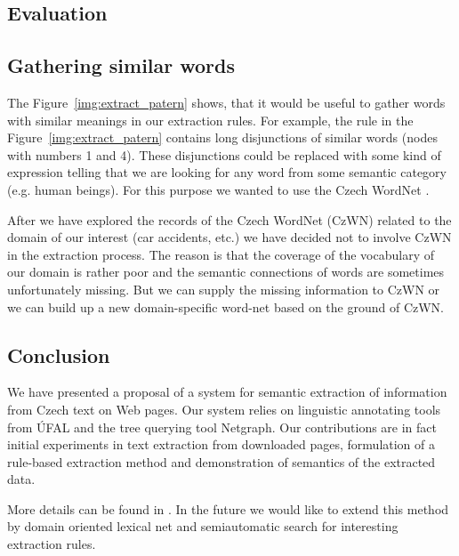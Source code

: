 \subsection{Evaluation}






\subsection{Gathering similar words}

The Figure~\ref{img:extract_patern} shows, that it would be useful to gather words with similar meanings in our extraction rules. For example, the rule in the Figure~\ref{img:extract_patern} contains long disjunctions of similar words (nodes with numbers 1 and 4). These disjunctions could be replaced with some kind of expression telling that we are looking for any word from some semantic category (e.g. human beings). For this purpose we wanted to use the Czech WordNet \citep{biblio:WordNetCZ2004}. 

After we have explored the records of the Czech WordNet (CzWN) related to the domain of our interest (car accidents, etc.) we have decided not to involve CzWN in the extraction process. The reason is that the coverage of the vocabulary of our domain is rather poor and the semantic connections of words are sometimes unfortunately missing. But we can supply the missing information to CzWN or we can build up a new domain-specific word-net based on the ground of CzWN.  


\subsection{Conclusion}


We have presented a proposal of a system for semantic extraction of information from Czech text on Web pages. Our system relies on linguistic annotating tools from ÚFAL and the tree querying tool Netgraph. Our contributions are in fact initial experiments in text extraction from downloaded pages, formulation of a rule-based extraction method and demonstration of semantics of the extracted data.

More details can be found in \citealt{biblio:DedekSemAnot2007}. In the future we would like to extend this method by domain oriented lexical net and semiautomatic search for interesting extraction rules.

